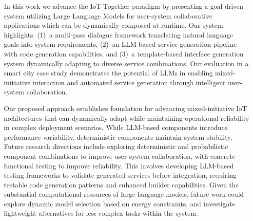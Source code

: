 




In this work we advance the IoT-Together paradigm by presenting a goal-driven system utilizing Large Language Models for user-system collaborative applications which can be dynamically composed at runtime. Our system highlights: (1)~a multi-pass dialogue framework translating natural language goals into system requirements, (2)~an LLM-based service generation pipeline with code generation capabilities, and (3)~a template-based interface generation system dynamically adapting to diverse service combinations. Our evaluation in a smart city case study demonstrates the potential of LLMs in enabling mixed-initiative interaction and automated service generation through intelligent user-system collaboration.

Our proposed approach establishes foundation for advancing mixed-initiative IoT architectures that can dynamically adapt while maintaining operational reliability in complex deployment scenarios. While LLM-based components introduce performance variability, deterministic components maintain system stability. Future research directions include exploring deterministic and probabilistic component combinations to improve user-system collaboration, with concrete functional testing to improve reliability. This involves developing LLM-based testing frameworks to validate generated services before integration, requiring testable code generation patterns and enhanced builder capabilities. Given the substantial computational resources of large language models, future work could explore dynamic model selection based on energy constraints, and investigate lightweight alternatives for less complex tasks within the system.
